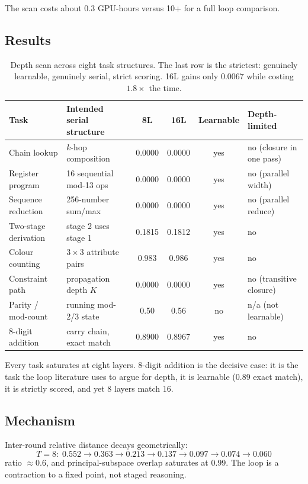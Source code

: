 \documentclass[10pt,twocolumn,letterpaper]{article}
\begin{document}
The scan costs about 0.3 GPU-hours versus 10+ for a full loop comparison.

\subsection{Results}

\begin{table}[t]
\centering
\small
\begin{tabular}{llcccl}
\toprule
Task & Intended serial structure & 8L & 16L & Learnable & Depth-limited \\
\midrule
Chain lookup         & $k$-hop composition        & 0.0000 & 0.0000 & yes & no (closure in one pass) \\
Register program     & 16 sequential mod-13 ops   & 0.0000 & 0.0000 & yes & no (parallel width) \\
Sequence reduction   & 256-number sum/max         & 0.0000 & 0.0000 & yes & no (parallel reduce) \\
Two-stage derivation & stage 2 uses stage 1       & 0.1815 & 0.1812 & yes & no \\
Colour counting      & $3\times3$ attribute pairs & 0.983  & 0.986  & yes & no \\
Constraint path      & propagation depth $K$      & 0.0000 & 0.0000 & yes & no (transitive closure) \\
Parity / mod-count   & running mod-2/3 state      & 0.50   & 0.56   & no  & n/a (not learnable) \\
8-digit addition     & carry chain, exact match   & 0.8900 & 0.8967 & yes & no \\
\bottomrule
\end{tabular}
\caption{Depth scan across eight task structures. The last row is the
strictest: genuinely learnable, genuinely serial, strict scoring. 16L gains
only 0.0067 while costing $1.8\times$ the time.}
\label{tab:loop}
\end{table}

Every task saturates at eight layers. 8-digit addition is the decisive case:
it is the task the loop literature uses to argue for depth, it is learnable
(0.89 exact match), it is strictly scored, and yet 8 layers match 16.

\subsection{Mechanism}

Inter-round relative distance decays geometrically:
\[
T{=}8:\; 0.552 \to 0.363 \to 0.213 \to 0.137 \to 0.097 \to 0.074 \to 0.060
\]
ratio $\approx 0.6$, and principal-subspace overlap saturates at 0.99. The
loop is a contraction to a fixed point, not staged reasoning.
\end{document}
